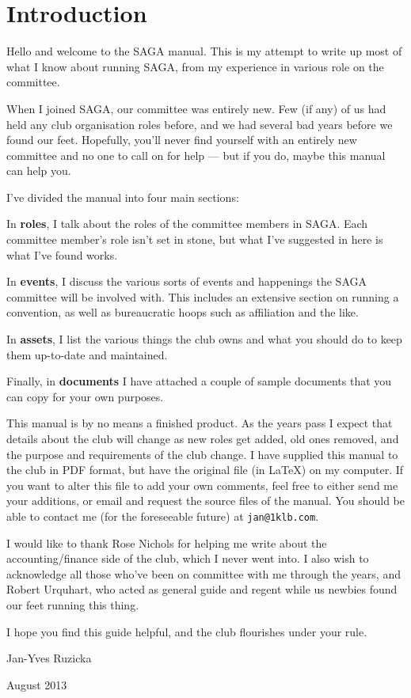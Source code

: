 \chapter*{Introduction}

Hello and welcome to the SAGA manual. This is my attempt to write up most of what I know about running SAGA, from my experience in various role on the committee.

When I joined SAGA, our committee was entirely new. Few (if any) of us had held any club organisation roles before, and we had several bad years before we found our feet. Hopefully, you'll never find yourself with an entirely new committee and no one to call on for help --- but if you do, maybe this manual can help you.

I've divided the manual into four main sections:

In \textbf{roles}, I talk about the roles of the committee members in SAGA. Each committee member's role isn't set in stone, but what I've suggested in here is what I've found works.

In \textbf{events}, I discuss the various sorts of events and happenings the SAGA committee will be involved with. This includes an extensive section on running a convention, as well as bureaucratic hoops such as affiliation and the like.

In \textbf{assets}, I list the various things the club owns and what you should do to keep them up-to-date and maintained.

Finally, in \textbf{documents} I have attached a couple of sample documents that you can copy for your own purposes.

This manual is by no means a finished product. As the years pass I expect that details about the club will change as new roles get added, old ones removed, and the purpose and requirements of the club change. I have supplied this manual to the club in PDF format, but have the original file (in \LaTeX) on my computer. If you want to alter this file to add your own comments, feel free to either send me your additions, or email and request the source files of the manual. You should be able to contact me (for the foreseeable future) at \texttt{jan@1klb.com}.

I would like to thank Rose Nichols for helping me write about the accounting/finance side of the club, which I never went into. I also wish to acknowledge all those who've been on committee with me through the years, and Robert Urquhart, who acted as general guide and regent while us newbies found our feet running this thing.

I hope you find this guide helpful, and the club flourishes under your rule.

\vspace{3em}

\hfill Jan-Yves Ruzicka

\hfill August 2013